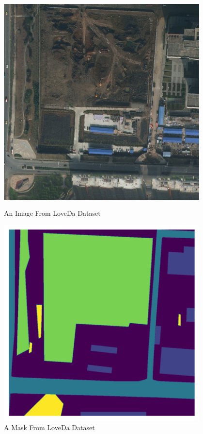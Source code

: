 \FloatBarrier
\begin{figure}[!htb]
    \centering
    \begin{minipage}{0.5\textwidth}
        \centering
        \includegraphics[width=0.95\textwidth, height=0.35\textheight]{images/loveda-image.png}
        \caption{An Image From LoveDa Dataset \protect\cite{loveda}}
        \label{fig:loveda-image}
    \end{minipage}\hfill
    \begin{minipage}{0.5\textwidth}
        \centering
        \includegraphics[width=0.95\textwidth, height=0.35\textheight]{images/loveda-mask.png}
\centering
\caption{A Mask From LoveDa Dataset \protect\cite{loveda}}
\label{fig:loveda-mask}
    \end{minipage}
\end{figure}
\FloatBarrier


